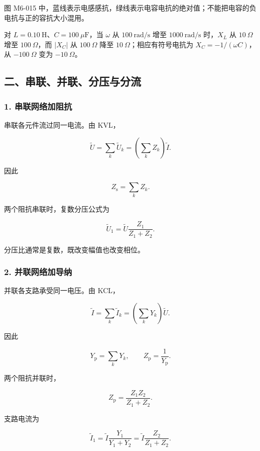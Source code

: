 图 M6-015
中，蓝线表示电感感抗，绿线表示电容电抗的绝对值；不能把电容的负电抗与正的容抗大小混用。

对 \(L=0.10\ \mathrm H\)、\(C=100\ \mu\mathrm F\)，当 \(\omega\) 从
\(100\ \mathrm{rad/s}\) 增至 \(1000\ \mathrm{rad/s}\) 时，\(X_L\) 从
\(10\ \Omega\) 增至 \(100\ \Omega\)，而 \(|X_C|\) 从 \(100\ \Omega\)
降至 \(10\ \Omega\)；相应有符号电抗为 \(X_C=-1/(\omega C)\)，从
\(-100\ \Omega\) 变为 \(-10\ \Omega\)。

\subsection{二、串联、并联、分压与分流}\label{m6:ux4e8cux4e32ux8054ux5e76ux8054ux5206ux538bux4e0eux5206ux6d41}

\subsubsection{1.
串联网络加阻抗}\label{m6:ux4e32ux8054ux7f51ux7edcux52a0ux963bux6297}

串联各元件流过同一电流。由 KVL，

\[
\widetilde U
=\sum_k\widetilde U_k
=\left(\sum_kZ_k\right)\widetilde I.
\]

因此

\[
\boxed{Z_{\mathrm s}=\sum_k Z_k}.
\]

两个阻抗串联时，复数分压公式为

\[
\boxed{
\widetilde U_1
=\widetilde U\frac{Z_1}{Z_1+Z_2}
}.
\]

分压比通常是复数，既改变幅值也改变相位。

\subsubsection{2.
并联网络加导纳}\label{m6:ux5e76ux8054ux7f51ux7edcux52a0ux5bfcux7eb3}

并联各支路承受同一电压。由 KCL，

\[
\widetilde I
=\sum_k\widetilde I_k
=\left(\sum_kY_k\right)\widetilde U.
\]

因此

\[
\boxed{Y_{\mathrm p}=\sum_kY_k},
\qquad
\boxed{Z_{\mathrm p}=\frac1{Y_{\mathrm p}}}.
\]

两个阻抗并联时，

\[
\boxed{Z_{\mathrm p}=\frac{Z_1Z_2}{Z_1+Z_2}}.
\]

支路电流为

\[
\boxed{
\widetilde I_1
=\widetilde I\frac{Y_1}{Y_1+Y_2}
=\widetilde I\frac{Z_2}{Z_1+Z_2}
}.
\]


